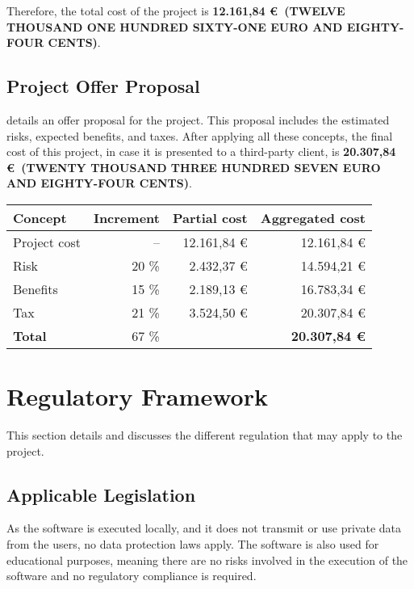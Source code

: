 Therefore, the total cost of the project is \textbf{12.161,84 \euro~(TWELVE THOUSAND ONE HUNDRED SIXTY-ONE EURO AND EIGHTY-FOUR CENTS)}.


\subsection{Project Offer Proposal}\label{subsec:offer-proposal}
 details an offer proposal for the project. This proposal includes the estimated risks, expected benefits, and taxes. After applying all these concepts, the final cost of this project, in case it is presented to a third-party client, is \textbf{20.307,84 \euro~(TWENTY THOUSAND THREE HUNDRED SEVEN EURO AND EIGHTY-FOUR CENTS)}.

\begin{table}[htb]
    {
      \begin{tabular}{lrrr}
        \toprule
        \textbf{Concept} & \textbf{Increment} & \textbf{Partial cost} & \textbf{Aggregated cost} \\
        \midrule
        Project cost   & --    & 12.161,84 \euro & 12.161,84 \euro \\
        Risk           & 20 \% &  2.432,37 \euro & 14.594,21 \euro \\
        Benefits       & 15 \% &  2.189,13 \euro & 16.783,34 \euro \\
        Tax            & 21 \% &  3.524,50 \euro & 20.307,84 \euro \\
        \midrule
        \textbf{Total} & 67 \% & & \textbf{20.307,84 \euro} \\
        \bottomrule
      \end{tabular}
    }
\end{table}



\section{Regulatory Framework}\label{sec:regulation}
This section details and discusses the different regulation that may apply to the project.

\subsection{Applicable Legislation}\label{subsec:legislation}
As the software is executed locally, and it does not transmit or use private data from the users, no data protection laws apply. The software is also used for educational purposes, meaning there are no risks involved in the execution of the software and no regulatory compliance is required.


